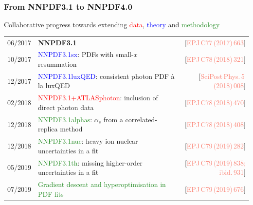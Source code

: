 \documentclass{beamer}
\begin{document}
\begin{frame}
 \frametitle{From NNPDF3.1 to NNPDF4.0}
 \footnotesize
 \begin{block}{}
  \centering
  Collaborative progress towards extending {\textcolor{red}{data}}, {\textcolor{blue}{theory}} and {\textcolor{forestgreen}{methodology}}\\
 \end{block}
 \scriptsize
 \renewcommand*{\arraystretch}{1.35}
 \begin{tabularx}{\textwidth}{lXr}
  06/2017 & {\bf NNPDF3.1}                                                              
          & {\tiny{[{\textcolor{salmon}{EPJ\,C77\,(2017)\,663}}]}}\\
  10/2017 & \textcolor{blue}{NNPDF3.1sx}: {\scriptsize PDFs with small-$x$ resummation}                                                
          & {\tiny{[{\textcolor{salmon}{EPJ\,C78\,(2018)\,321}}]}}\\
  12/2017 & \textcolor{blue}{NNPDF3.1luxQED}: {\scriptsize consistent photon PDF \`a la luxQED}                                            
          & {\tiny{[{\textcolor{salmon}{SciPost\,Phys.\,5\,(2018)\,008}}]}}\\
  02/2018 & \textcolor{red}{NNPDF3.1+ATLASphoton}: {\scriptsize inclusion of direct photon data}                                       
          & {\tiny{[{\textcolor{salmon}{EPJ\,C78\,(2018)\,470}}]}}\\
  12/2018 & \textcolor{forestgreen}{NNPDF3.1alphas}: {\scriptsize $\alpha_s$ from a correlated-replica method}                                     
          & {\tiny{[{\textcolor{salmon}{EPJ\,C78\,(2018)\,408}}]}}\\
  12/2018 & \textcolor{forestgreen}{NNPDF3.1nuc}: {\scriptsize heavy ion nuclear uncertainties in a fit}                                        
          & {\tiny{[{\textcolor{salmon}{EPJ\,C79\,(2019)\,282}}]}}\\
  05/2019 & \textcolor{forestgreen}{NNPDF3.1th}: {\scriptsize missing higher-order uncertainties in a fit}                                         
          & {\tiny{[{\textcolor{salmon}{EPJ\,C79\,(2019)\,838; ibid.\,931}}]}}\\
  07/2019 & \textcolor{forestgreen}{Gradient descent and hyperoptimisation in PDF fits} 
          & {\tiny{[{\textcolor{salmon}{EPJ\,C79\,(2019)\,676}}]}}\\

\end{tabularx}
\end{frame}
\end{document}
